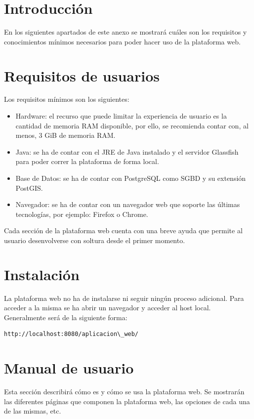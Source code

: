 
\section{Introducción}
En los siguientes apartados de este anexo se mostrará cuáles son los requisitos  y conocimientos mínimos necesarios para poder hacer uso de la plataforma web.

\section{Requisitos de usuarios}
Los requisitos mínimos son los siguientes:

\begin{itemize}
	\item Hardware: el recurso que puede limitar la experiencia de usuario es la cantidad de memoria RAM disponible, por ello, se recomienda contar con, al menos, 3 GiB de memoria RAM.
	\item Java: se ha de contar con el JRE de Java instalado y el servidor Glassfish para poder correr la plataforma de forma local.
	\item Base de Datos: se ha de contar con PostgreSQL como SGBD y su extensión PostGIS.
	\item Navegador: se ha de contar con un navegador web que soporte las últimas tecnologías, por ejemplo: Firefox o Chrome.
\end{itemize}

Cada sección de la plataforma web cuenta con una breve ayuda que permite al usuario desenvolverse con soltura desde el primer momento.

\section{Instalación}
La plataforma web no ha de instalarse ni seguir ningún proceso adicional. Para acceder a la misma se ha abrir un navegador y acceder al host local. Generalmente será de la siguiente forma:

\begin{lstlisting}[language=bash]
  http://localhost:8080/aplicacion\_web/
\end{lstlisting}

\section{Manual de usuario}
Esta sección describirá cómo es y cómo se usa la plataforma web. Se mostrarán las diferentes páginas que componen la plataforma web, las opciones de cada una de las mismas, etc.

